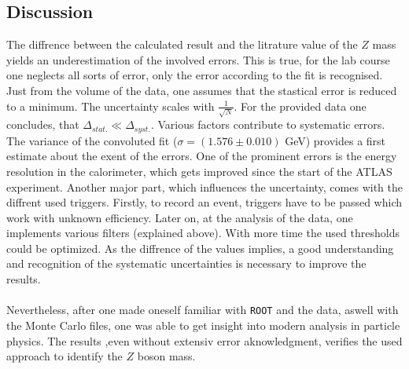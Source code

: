 \documentclass[12pt, a4paper, bibliography=totoc]{scrartcl}
\begin{document}
\begin{multicols}{2}
\section{Discussion}
The diffrence between the calculated result and the litrature value of the $Z$ mass yields an underestimation of the involved errors. This is true, for the lab course one neglects all sorts of error, only the error according to the fit is recognised.
Just from the volume of the data, one assumes that the stastical error is reduced to a minimum. The uncertainty scales with $\frac{1}{\sqrt{N}}$.
For the provided data one concludes, that $\Delta_{stat.} \ll \Delta_{syst.}$.
Various factors contribute to systematic errors. The variance of the convoluted fit ($\sigma = (1.576 \pm 0.010)$ GeV) provides a first estimate about the exent of the errors.
One of the prominent errors is the energy resolution in the calorimeter, which gets improved since the start of the ATLAS experiment. 
Another major part, which influences the uncertainty, comes with the diffrent used triggers.
Firstly, to record an event, triggers have to be passed which work with unknown efficiency. 
Later on, at the analysis of the data, one implements various filters (explained above). With more time the used thresholds could be optimized.
As the diffrence of the values implies, a good understanding and recognition of the systematic uncertainties is necessary to improve the results.\\
\\
Nevertheless, after one made oneself familiar with \verb*+ROOT+ and the data, aswell with the Monte Carlo files, one was able to get insight into modern analysis in particle physics. The results ,even without extensiv error aknowledgment, verifies the used approach to identify the $Z$ boson mass.  


\nocite{*}
\appendix
\printbibliography
\end{multicols}
\end{document}
